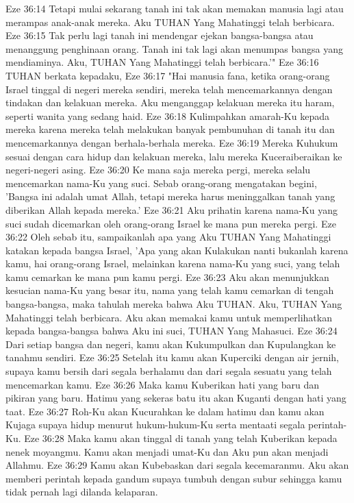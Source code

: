 Eze 36:14  Tetapi mulai sekarang tanah ini tak akan memakan manusia lagi atau merampas anak-anak mereka. Aku TUHAN Yang Mahatinggi telah berbicara.
Eze 36:15  Tak perlu lagi tanah ini mendengar ejekan bangsa-bangsa atau menanggung penghinaan orang. Tanah ini tak lagi akan menumpas bangsa yang mendiaminya. Aku, TUHAN Yang Mahatinggi telah berbicara.'"
Eze 36:16  TUHAN berkata kepadaku,
Eze 36:17  "Hai manusia fana, ketika orang-orang Israel tinggal di negeri mereka sendiri, mereka telah mencemarkannya dengan tindakan dan kelakuan mereka. Aku menganggap kelakuan mereka itu haram, seperti wanita yang sedang haid.
Eze 36:18  Kulimpahkan amarah-Ku kepada mereka karena mereka telah melakukan banyak pembunuhan di tanah itu dan mencemarkannya dengan berhala-berhala mereka.
Eze 36:19  Mereka Kuhukum sesuai dengan cara hidup dan kelakuan mereka, lalu mereka Kuceraiberaikan ke negeri-negeri asing.
Eze 36:20  Ke mana saja mereka pergi, mereka selalu mencemarkan nama-Ku yang suci. Sebab orang-orang mengatakan begini, 'Bangsa ini adalah umat Allah, tetapi mereka harus meninggalkan tanah yang diberikan Allah kepada mereka.'
Eze 36:21  Aku prihatin karena nama-Ku yang suci sudah dicemarkan oleh orang-orang Israel ke mana pun mereka pergi.
Eze 36:22  Oleh sebab itu, sampaikanlah apa yang Aku TUHAN Yang Mahatinggi katakan kepada bangsa Israel, 'Apa yang akan Kulakukan nanti bukanlah karena kamu, hai orang-orang Israel, melainkan karena nama-Ku yang suci, yang telah kamu cemarkan ke mana pun kamu pergi.
Eze 36:23  Aku akan menunjukkan kesucian nama-Ku yang besar itu, nama yang telah kamu cemarkan di tengah bangsa-bangsa, maka tahulah mereka bahwa Aku TUHAN. Aku, TUHAN Yang Mahatinggi telah berbicara. Aku akan memakai kamu untuk memperlihatkan kepada bangsa-bangsa bahwa Aku ini suci, TUHAN Yang Mahasuci.
Eze 36:24  Dari setiap bangsa dan negeri, kamu akan Kukumpulkan dan Kupulangkan ke tanahmu sendiri.
Eze 36:25  Setelah itu kamu akan Kuperciki dengan air jernih, supaya kamu bersih dari segala berhalamu dan dari segala sesuatu yang telah mencemarkan kamu.
Eze 36:26  Maka kamu Kuberikan hati yang baru dan pikiran yang baru. Hatimu yang sekeras batu itu akan Kuganti dengan hati yang taat.
Eze 36:27  Roh-Ku akan Kucurahkan ke dalam hatimu dan kamu akan Kujaga supaya hidup menurut hukum-hukum-Ku serta mentaati segala perintah-Ku.
Eze 36:28  Maka kamu akan tinggal di tanah yang telah Kuberikan kepada nenek moyangmu. Kamu akan menjadi umat-Ku dan Aku pun akan menjadi Allahmu.
Eze 36:29  Kamu akan Kubebaskan dari segala kecemaranmu. Aku akan memberi perintah kepada gandum supaya tumbuh dengan subur sehingga kamu tidak pernah lagi dilanda kelaparan.
